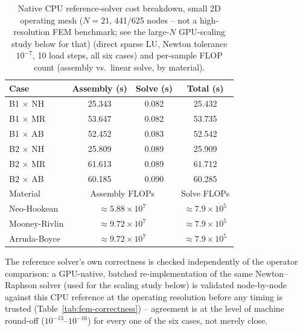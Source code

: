 \documentclass[final,5p,times]{elsarticle}
\begin{document}
\begin{table}[h]
\centering
\caption{Native CPU reference-solver cost breakdown, small 2D operating
  mesh ($N{=}21$, 441/625 nodes -- not a high-resolution FEM benchmark;
  see the large-$N$ GPU-scaling study below for that) (direct sparse LU,
  Newton tolerance $10^{-7}$, 10 load steps, all six cases) and per-sample
  FLOP count (assembly vs.\ linear solve, by material).}
\label{tab:fem-cost}
\small
\begin{tabular}{lccc}
\toprule
Case & Assembly (s) & Solve (s) & Total (s) \\
\midrule
B1 $\times$ NH & 25.343 & 0.082 & 25.432 \\
B1 $\times$ MR & 53.647 & 0.082 & 53.735 \\
B1 $\times$ AB & 52.452 & 0.083 & 52.542 \\
B2 $\times$ NH & 25.809 & 0.089 & 25.909 \\
B2 $\times$ MR & 61.613 & 0.089 & 61.712 \\
B2 $\times$ AB & 60.185 & 0.090 & 60.285 \\
\midrule
Material & \multicolumn{2}{c}{Assembly FLOPs} & Solve FLOPs \\
\midrule
Neo-Hookean    & \multicolumn{2}{c}{$\approx5.88\times10^{7}$} & $\approx7.9\times10^{5}$ \\
Mooney-Rivlin  & \multicolumn{2}{c}{$\approx9.72\times10^{7}$} & $\approx7.9\times10^{5}$ \\
Arruda-Boyce   & \multicolumn{2}{c}{$\approx9.72\times10^{7}$} & $\approx7.9\times10^{5}$ \\
\bottomrule
\end{tabular}
\end{table}

The reference solver's own correctness is checked independently of the
operator comparison: a GPU-native, batched re-implementation of the same
Newton\mbox{--}Raphson solver (used for the scaling study below) is validated
node-by-node against this CPU reference at the operating resolution
before any timing is trusted
(Table~\ref{tab:fem-correctness}) -- agreement is at the level of machine
round-off ($10^{-13}$--$10^{-16}$) for every one of the six cases, not
merely close.
\end{document}
